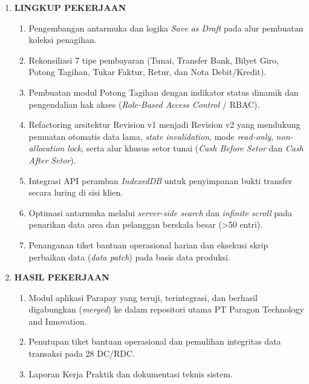 \begin{framed}
\begin{enumerate}[label=\arabic*.,leftmargin=0.8cm,itemsep=8pt,topsep=4pt,parsep=0pt,partopsep=0pt]
\item \textbf{LINGKUP PEKERJAAN}
  \begin{enumerate}[label=\alph*),topsep=2pt,itemsep=2pt,parsep=0pt,partopsep=0pt,leftmargin=0.5cm]
    \item Pengembangan antarmuka dan logika \textit{Save as Draft} pada alur pembuatan koleksi penagihan.
    \item Rekonsiliasi 7 tipe pembayaran (Tunai, Transfer Bank, Bilyet Giro, Potong Tagihan, Tukar Faktur, Retur, dan Nota Debit/Kredit).
    \item Pembuatan modul Potong Tagihan dengan indikator status dinamik dan pengendalian hak akses (\textit{Role-Based Access Control} / RBAC).
    \item Refactoring arsitektur Revision v1 menjadi Revision v2 yang mendukung pemuatan otomatis data lama, \textit{state invalidation}, mode \textit{read-only}, \textit{non-allocation lock}, serta alur khusus setor tunai (\textit{Cash Before Setor} dan \textit{Cash After Setor}).
    \item Integrasi API peramban \textit{IndexedDB} untuk penyimpanan bukti transfer secara luring di sisi klien.
    \item Optimasi antarmuka melalui \textit{server-side search} dan \textit{infinite scroll} pada penarikan data area dan pelanggan berskala besar (>50 entri).
    \item Penanganan tiket bantuan operasional harian dan eksekusi skrip perbaikan data (\textit{data patch}) pada basis data produksi.
  \end{enumerate}

\item \textbf{HASIL PEKERJAAN}
  \begin{enumerate}[label=\alph*),topsep=2pt,itemsep=2pt,parsep=0pt,partopsep=0pt,leftmargin=0.5cm]
    \item Modul aplikasi Parapay yang teruji, terintegrasi, dan berhasil digabungkan (\textit{merged}) ke dalam repositori utama PT Paragon Technology and Innovation.
    \item Penutupan tiket bantuan operasional dan pemulihan integritas data transaksi pada 28 DC/RDC.
    \item Laporan Kerja Praktik dan dokumentasi teknis sistem.
  \end{enumerate}


\end{enumerate}
\end{framed}
